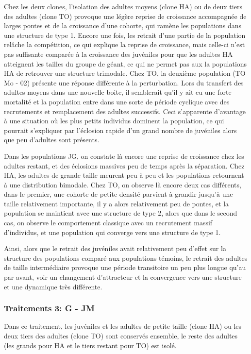 Chez les deux clones, l'isolation des adultes moyens (clone HA) ou de deux tiers
des adultes (clone TO) provoque une légère reprise de croissance accompagnée de
larges pontes et de la croissance d'une cohorte, qui ramène les populations dans
une structure de type 1. Encore une fois, les retrait d'une partie de la
population relâche la compétition, ce qui explique la reprise de croissance,
mais celle-ci n'est pas suffisante comparée à la croissance des juvéniles pour
que les adultes HA atteignent les tailles du groupe de géant, ce qui ne permet
pas aux la populations HA de retrouver une structure trimodale. Chez TO, la
deuxième population (TO Mo - 02) présente une réponse différente à la
perturbation. Lors du transfert des adultes moyens dans une nouvelle boite, il
semblerait qu'il y ait eu une forte mortalité et la population entre dans une
sorte de période cyclique avec des recrutements et remplacement des adultes
successifs. Ceci s'apparente d'avantage à une situation où les plus petits
individus dominent la population, ce qui pourrait s'expliquer par l'éclosion
rapide d'un grand nombre de juvéniles alors que peu d'adultes sont présents. 

Dans les populations JG, on constate là encore une reprise de croissance chez
les adultes restant, et des éclosions massives peu de temps après la séparation.
Chez HA, les adultes de grande taille meurent peu à peu et les populations
retournent à une distribution bimodale. Chez TO, on observe là encore deux cas
différents, dans le premier, une cohorte de petite densité parvient à grandir
jusqu'à une taille relativement importante, il y a alors relativement peu de
pontes, et la population se maintient avec une structure de type 2, alors que
dans le second cas, on observe le comportement classique avec un recrutement
massif d'individus, et une population qui converge vers une structure de type 1. 

Ainsi, alors que le retrait des juvéniles avait relativement peu d'effet sur la
structure des populations comparé aux populations témoins, le retrait des
adultes de taille intermédiaire provoque une période transitoire un peu plus
longue qu'au par avant, voir un changement d'attracteur et la convergence vers
une structure et une dynamique très différente. 

\subsubsection{Traitements 3: G - JM}

Dans ce traitement, les juvéniles et les adultes de petite taille (clone HA) ou
les deux tiers des adultes (clone TO) sont conservés ensemble, le reste des
adultes (les grands pour HA et le tiers restant pour TO) est isolé. 

